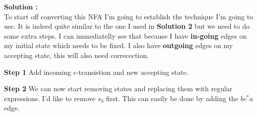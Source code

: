 \documentclass{article}
\newcounter{problem}
\newcommand\TheSolution{%
  \textbf{Solution \theproblem:}\\%
}
\begin{document}
\TheSolution To start off converting this NFA I'm going to establish the technique I'm going to use. It is
indeed quite similar to the one I used in \textbf{Solution 2} but we need to do some extra steps.
I can immediatelly see that because I have \textbf{in-going} edges on my initial state which needs to be 
fixed. I also have \textbf{outgoing} edges on my accepting state, this will also need correcection.

\textbf{Step 1} Add incoming $\epsilon$-transistion and new accepting state.
\begin{center}
\end{center} 

\newpage
\textbf{Step 2} We can now start removing states and replacing them with regular expressions. I'd like to 
remove $s_3$ first. This can easily be done by adding the $bc^*a$ edge.
\end{document}
